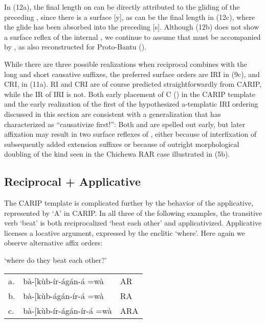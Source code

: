 \documentclass[output=paper,
modfonts
]{LSP/langsci}
\begin{document}
\noindent In (12a), the final length on  can be directly attributed to
the gliding of the preceding , since there is a surface {[}y{]}, as
can be the final length in (12c), where the glide has been absorbed into
the preceding {[}s{]}. Although (12b) does not show a surface reflex of
the internal , we continue to assume that  must be
accompanied by , as also reconstructed for Proto-Bantu (\citet{bastin1986}).

While there are three possible realizations when reciprocal
 combines with the long and short causative suffixes, the
preferred surface orders are IRI in (9c), and CRI, in (11a). RI and CRI
are of course predicted straightforwardly from CARIP, while the IR of
IRI is not. Both early placement of C () in the CARIP
template and the early realization of the first  of the
hypothesized a-templatic IRI ordering discussed in this section are
consistent with a generalization that \citet[272]{hyman2003} has
characterized as ``causativize first!'': Both  and 
are spelled out early, but later affixation may result in two surface
reflexes of , either because of interfixation of subsequently
added extension suffixes or because of outright morphological 
doubling of the kind seen in the Chichewa RAR case illustrated in (5b).

\subsection{Reciprocal + Applicative}

The CARIP template is complicated further by the behavior of the
applicative, represented by `A' in CARIP. In all three of the following
examples, the transitive verb  `beat' is both reciprocalized
`beat each other' and applicativized. Applicative  licenses a
locative argument, expressed by the enclitic  `where'. Here
again we observe alternative affix orders:

\ea `where do they beat each other?'\\
\begin{tabular}{@{}lll@{}}
a. & bà-{[}kùb-ír-ágán-á =wà & AR  \\
b. & bà-{[}kùb-ágán-ír-á =wà & RA \\
c. & bà-{[}kùb-ír-ágán-ír-á =wà & ARA \\
\end{tabular}
\z
\end{document}
